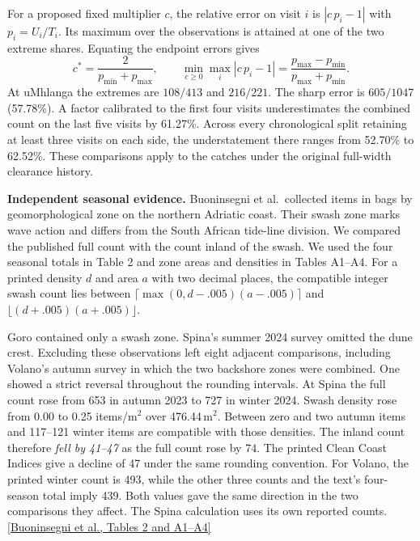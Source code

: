 \documentclass[10pt]{article}
\newcommand{\para}[1]{\medskip\textbf{#1}\enspace}
\newcommand{\src}[2]{\href{#1}{[#2]}}
\begin{document}
For a proposed fixed multiplier $c$, the relative error on visit $i$ is
$|c\,p_i-1|$ with $p_i=U_i/T_i$. Its maximum over the observations is attained at one of the two extreme shares. Equating the endpoint errors gives
\[
c^*=\frac{2}{p_{\min}+p_{\max}},\qquad
\min_{c\ge 0}\max_i |c\,p_i-1|=\frac{p_{\max}-p_{\min}}{p_{\max}+p_{\min}} .
\]
At uMhlanga the extremes are $108/413$ and $216/221$. The sharp error is $605/1047$ (57.78\%). A factor calibrated to the first four visits underestimates the combined count on the last five visits by 61.27\%. Across every chronological split retaining at least three visits on each side, the understatement there ranges from 52.70\% to 62.52\%. These comparisons apply to the catches under the original full-width clearance history.

\para{Independent seasonal evidence.}
Buoninsegni et al.\ collected items in bags by geomorphological zone on the northern Adriatic coast. Their swash zone marks wave action and differs from the South African tide-line division. We compared the published full count with the count inland of the swash. We used the four seasonal totals in Table 2 and zone areas and densities in Tables A1--A4. For a printed density $d$ and area $a$ with two decimal places, the compatible integer swash count lies between
$\lceil\max(0,d-.005)(a-.005)\rceil$ and $\lfloor(d+.005)(a+.005)\rfloor$.

Goro contained only a swash zone. Spina's summer 2024 survey omitted the dune crest. Excluding these observations left eight adjacent comparisons, including Volano's autumn survey in which the two backshore zones were combined. One showed a strict reversal throughout the rounding intervals. At Spina the full count rose from 653 in autumn 2023 to 727 in winter 2024. Swash density rose from 0.00 to 0.25 items/m$^2$ over 476.44\,m$^2$. Between zero and two autumn items and 117--121 winter items are compatible with those densities. The inland count therefore \emph{fell by 41--47} as the full count rose by 74. The printed Clean Coast Indices give a decline of 47 under the same rounding convention. For Volano, the printed winter count is 493, while the other three counts and the text's four-season total imply 439. Both values gave the same direction in the two comparisons they affect. The Spina calculation uses its own reported counts.
\src{https://www.mdpi.com/2073-4441/17/15/2173}{Buoninsegni et al., Tables 2 and A1--A4}
\end{document}
